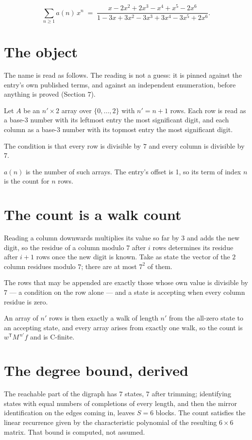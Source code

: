\documentclass[11pt]{article}
\theoremstyle{definition}
\begin{document}
\[\sum_{n \ge 1} a(n)\,x^n \;=\; \frac{x - 2x^{2} + 2x^{3} - x^{4} + x^{5} - 2x^{6}}{1 - 3x + 3x^{2} - 3x^{3} + 3x^{4} - 3x^{5} + 2x^{6}}.\]

\section{The object}

The name is read as follows. The reading is not a guess: it is pinned against the entry's own published terms, and against an independent enumeration, before anything is proved (Section 7).

Let $A$ be an $n' \times 2$ array over $\{0,\dots,2\}$ with $n' = n + 1$ rows. Each row is read as a base-$3$ number with its leftmost entry the most significant digit, and each column as a base-$3$ number with its topmost entry the most significant digit.

The condition is that every row is divisible by $7$ and every column is divisible by $7$.

$a(n)$ is the number of such arrays. The entry's offset is 1, so its term of index $n$ is the count for $n$ rows.

\section{The count is a walk count}

Reading a column downwards multiplies its value so far by $3$ and adds the new digit, so the residue of a column modulo $7$ after $i$ rows determines its residue after $i+1$ rows once the new digit is known. Take as state the vector of the $2$ column residues modulo $7$; there are at most $7^{2}$ of them.

The rows that may be appended are exactly those whose own value is divisible by $7$ --- a condition on the row alone --- and a state is accepting when every column residue is zero.

An array of $n'$ rows is then exactly a walk of length $n'$ from the all-zero state to an accepting state, and every array arises from exactly one walk, so the count is $w^{\mathsf T}M^{\,n'}f$ and is C-finite.

\section{The degree bound, derived}

The reachable part of the digraph has $7$ states, $7$ after trimming; identifying states with equal numbers of completions of every length, and then the mirror identification on the edges coming in, leaves $S = 6$ blocks. The count satisfies the linear recurrence given by the characteristic polynomial of the resulting $6\times6$ matrix. That bound is computed, not assumed.
\end{document}
